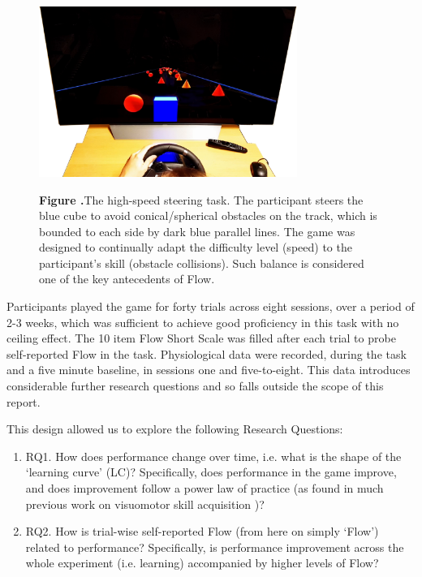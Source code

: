 \documentclass{frontierstyle/frontiersSCNS}
\newcommand{\nicewidth}{0.75\textwidth}
\begin{document}
\begin{figure}[!ht]
\begin{center}
	\includegraphics[width=\nicewidth]{Screenshot_cogcarsim}
\end{center}
	\textbf{\label{fig:cogcarsim} Figure .}{The high-speed steering task. The participant steers the blue cube to avoid conical/spherical obstacles on the track, which is bounded to each side by dark blue parallel lines. The game was designed to continually adapt the difficulty level (speed) to the participant's skill (obstacle collisions). Such balance is considered one of the key antecedents of Flow.}
\end{figure}

Participants played the game for forty trials across eight sessions, over a period of 2-3 weeks, which was sufficient to achieve good proficiency in this task with no ceiling effect. The 10 item Flow Short Scale \citep{Engeser2008} was filled after each trial to probe self-reported Flow in the task. Physiological data were recorded, during the task and a five minute baseline, in sessions one and five-to-eight. This data introduces considerable further research questions and so falls outside the scope of this report.

This design allowed us to explore the following Research Questions:
\begin{enumerate}
	\item RQ1. How does performance change over time, i.e. what is the shape of the `learning curve' (LC)? Specifically, does performance in the game improve, and does improvement follow a power law of practice (as found in much previous work on visuomotor skill acquisition \citep{Newell1982})?

	\item RQ2. How is trial-wise self-reported Flow (from here on simply `Flow') related to performance? Specifically, is performance improvement across the whole experiment (i.e. learning) accompanied by higher levels of Flow?

\end{enumerate}
\end{document}

